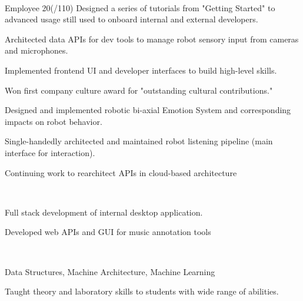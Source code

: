\documentclass[]{csaund_resume-openfont}
\begin{document}
\begin{minipage}[t]{0.66\textwidth}
 \\
\begin{tightemize}
\item Employee 20(/110) Designed a series of tutorials from "Getting Started" to advanced usage still used to onboard internal and external developers.
\item Architected data APIs for dev tools to manage robot sensory input from cameras and microphones.
\item Implemented frontend UI and developer interfaces to build high-level skills.
\item Won first company culture award for "outstanding cultural contributions."
\end{tightemize}
\begin{tightemize}
\item Designed and implemented robotic bi-axial Emotion System and corresponding impacts on robot behavior.
\item Single-handedly architected and maintained robot listening pipeline (main interface for interaction).
\end{tightemize}
\begin{tightemize}
\item Continuing work to rearchitect APIs in cloud-based architecture
\end{tightemize}
\sectionsep

 \\
\begin{tightemize}
\item Full stack development of internal desktop application.
\item Developed web APIs and GUI for music annotation tools
\end{tightemize}
\sectionsep

\\
\begin{tightemize}
\item Data Structures, Machine Architecture, Machine Learning
\item Taught theory and laboratory skills to students with wide range of abilities.
\end{tightemize}
\sectionsep



\end{minipage}
\end{document}
